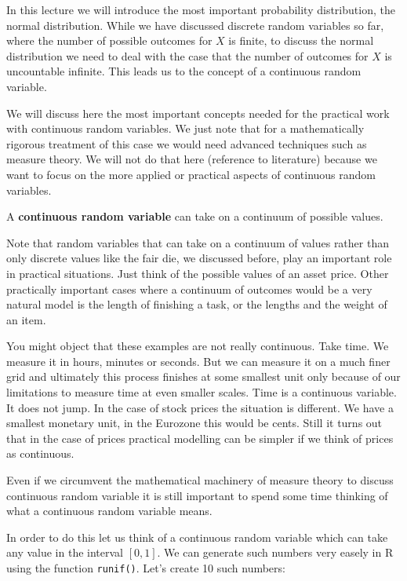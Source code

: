 \documentclass[
]{book}
\providecommand{\tightlist}{%
  \setlength{\itemsep}{0pt}\setlength{\parskip}{0pt}}
\begin{document}
In this lecture we will introduce the most important probability distribution, the normal
distribution. While we have discussed discrete random variables so far, where the
number of possible outcomes for \(X\) is finite, to discuss the normal distribution we
need to deal with the case that the number of outcomes for \(X\) is uncountable infinite.
This leads us to the concept of a continuous random variable.

We will discuss here the most important concepts needed for the practical work with
continuous random variables. We just note that for a mathematically rigorous treatment
of this case we would need advanced techniques such as measure theory. We will not do that here
(reference to literature) because we want to focus on the more applied or practical aspects
of continuous random variables.

\begin{description}
\tightlist
\item[Continuous random variable]
A \textbf{continuous random variable} can take on a continuum of possible values.
\end{description}

Note that random variables that can take on a continuum of values rather than only discrete values
like the fair die, we discussed before, play an important role in practical situations. Just think
of the possible values of an asset price. Other practically important cases where a continuum
of outcomes would be a very natural model is the length of finishing a task, or the lengths and the
weight of an item.

You might object that these examples are not really continuous. Take time. We measure it in
hours, minutes or seconds. But we can measure it on a much finer grid and ultimately this
process finishes at some smallest unit only because of our limitations to measure time
at even smaller scales. Time is a continuous variable. It does not jump. In the case of stock
prices the situation is different. We have a smallest monetary unit, in the Eurozone this would
be cents. Still it turns out that in the case of prices practical modelling can be
simpler if we think of prices as continuous.

Even if we circumvent the mathematical machinery of measure theory to discuss
continuous random variable it is still important to spend some time thinking of what
a continuous random variable means.

In order to do this let us think of a continuous random variable which can take any
value in the interval \([0,1]\). We can generate such numbers very easely in R using the
function \texttt{runif()}. Let's create 10 such numbers:
\end{document}
